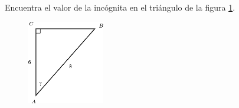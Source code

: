 Encuentra el valor de la incógnita en el triángulo de la figura \ref{fig:angle_functrig_16}.
\begin{figure}[H]
    \begin{center}
        \includegraphics[width=0.3\textwidth]{../images/angle_functrig_16.png}
    \end{center}
    \caption{}
    \label{fig:angle_functrig_16}
\end{figure}
